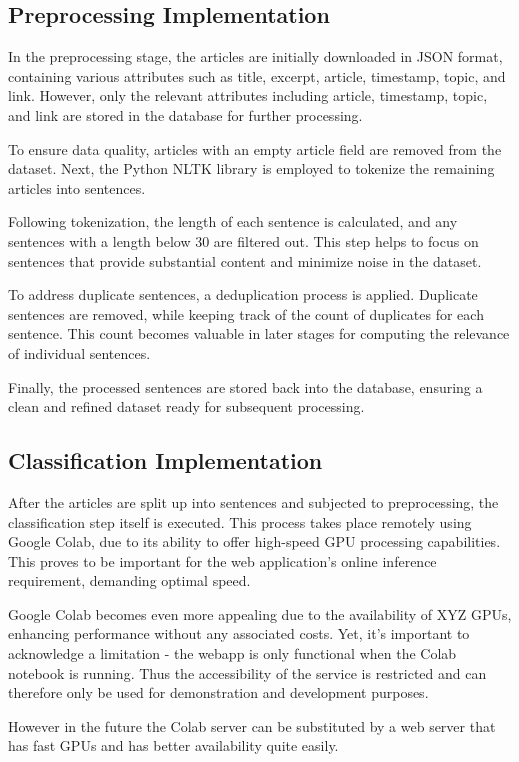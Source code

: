 \documentclass[a4paper,12pt]{report} %
\begin{document}
\subsection{Preprocessing Implementation}
In the preprocessing stage, the articles are initially downloaded in JSON format, containing various attributes such as title, excerpt, article, timestamp, topic, and link. However, only the relevant attributes including article, timestamp, topic, and link are stored in the database for further processing.

To ensure data quality, articles with an empty article field are removed from the dataset. Next, the Python NLTK library is employed to tokenize the remaining articles into sentences.

Following tokenization, the length of each sentence is calculated, and any sentences with a length below 30 are filtered out. This step helps to focus on sentences that provide substantial content and minimize noise in the dataset.

To address duplicate sentences, a deduplication process is applied. Duplicate sentences are removed, while keeping track of the count of duplicates for each sentence. This count becomes valuable in later stages for computing the relevance of individual sentences.

Finally, the processed sentences are stored back into the database, ensuring a clean and refined dataset ready for subsequent processing.

\subsection{Classification Implementation}
After the articles are split up into sentences and subjected to preprocessing, the classification step itself is executed. This process takes place remotely using Google Colab, due to its ability to offer high-speed GPU processing capabilities. This proves to be important for the web application's online inference requirement, demanding optimal speed.

Google Colab becomes even more appealing due to the availability of XYZ GPUs, enhancing performance without any associated costs. Yet, it's important to acknowledge a limitation - the webapp is only functional when the Colab notebook is running. Thus the accessibility of the service is restricted and can therefore only be used for demonstration and development purposes.

However in the future the Colab server can be substituted by a web server that has fast GPUs and has better availability quite easily.
\end{document}
